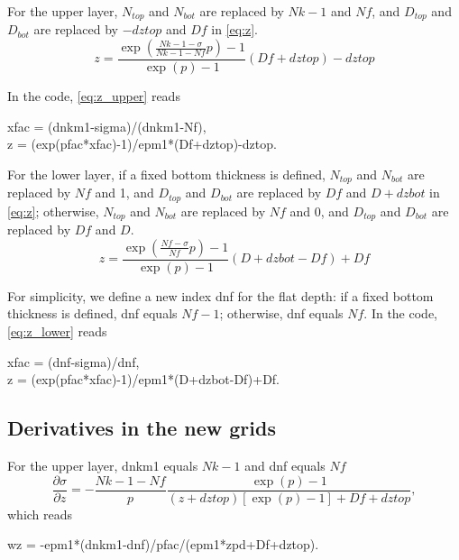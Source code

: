 \documentclass[12pt,letterpaper,titlepage]{article}
\newcommand{\Blue}[1]{{\color{blue}#1}}
\begin{document}

For the upper layer, $N_{top}$ and $N_{bot}$ are replaced by $Nk-1$ and $Nf$, and $D_{top}$ and $D_{bot}$ are replaced by $-dztop$ and $Df$ in \eqref{eq:z}.
\begin{equation}
  z = \frac{\exp\left(\frac{Nk-1-\sigma}{Nk-1 - Nf} p\right) - 1}{\exp(p)-1} (Df +dztop)-dztop \label{eq:z_upper}
\end{equation}

In the code, \eqref{eq:z_upper} reads
\begin{center}
xfac = (dnkm1-sigma)/(dnkm1-Nf), \\
z = (exp(pfac*xfac)-1)/epm1*(Df+dztop)-dztop.
\end{center}

For the lower layer, if a fixed bottom thickness is defined, $N_{top}$ and $N_{bot}$ are replaced by $Nf$ and 1, and $D_{top}$ and $D_{bot}$ are replaced by $Df$ and $D+dzbot$ in \eqref{eq:z}; otherwise, $N_{top}$ and $N_{bot}$ are replaced by $Nf$ and 0, and $D_{top}$ and $D_{bot}$ are replaced by $Df$ and $D$.
\begin{equation}
  z = \frac{\exp\left(\frac{Nf-\sigma}{Nf} p\right) - 1}{\exp(p)-1} (D +dzbot - Df)+Df \label{eq:z_lower}
\end{equation}

For simplicity, we define a new index \Blue{dnf} for the flat depth: if a fixed bottom thickness is defined, dnf equals $Nf-1$; otherwise, dnf equals $Nf$. In the code, \eqref{eq:z_lower} reads
\begin{center}
xfac = (dnf-sigma)/dnf,\\
z = (exp(pfac*xfac)-1)/epm1*(D+dzbot-Df)+Df.
\end{center}

\subsection{Derivatives in the new grids}

For the upper layer, dnkm1 equals $Nk-1$ and dnf equals $Nf$
\begin{equation}
\frac{\partial \sigma}{\partial z} =-\frac{Nk-1-Nf}{p}\frac{\exp(p)-1}{(z+dztop)[\exp(p)-1]+Df+dztop},
\end{equation}
which reads
\begin{center}
wz = -epm1*(dnkm1-dnf)/pfac/(epm1*zpd+Df+dztop).
\end{center}
\end{document}
